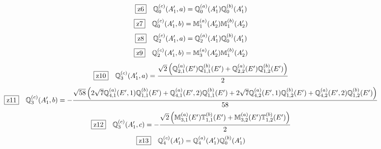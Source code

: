\documentclass[fleqn,10pt,landscape]{jsarticle}
\begin{document}
\begin{dmath*}
\hspace*{3mm}\fbox{z6}\quad \mathbb{Q}_{0}^{(c)}(A_{1}^{\prime},a)=\mathbb{Q}_{0}^{(a)}(A_{1}^{\prime}) \mathbb{Q}_{0}^{(b)}(A_{1}^{\prime})
\end{dmath*}
\begin{dmath*}
\hspace*{3mm}\fbox{z7}\quad \mathbb{Q}_{0}^{(c)}(A_{1}^{\prime},b)=\mathbb{M}_{1}^{(a)}(A_{2}^{\prime}) \mathbb{M}_{1}^{(b)}(A_{2}^{\prime})
\end{dmath*}
\begin{dmath*}
\hspace*{3mm}\fbox{z8}\quad \mathbb{Q}_{2}^{(c)}(A_{1}^{\prime},a)=\mathbb{Q}_{2}^{(a)}(A_{1}^{\prime}) \mathbb{Q}_{0}^{(b)}(A_{1}^{\prime})
\end{dmath*}
\begin{dmath*}
\hspace*{3mm}\fbox{z9}\quad \mathbb{Q}_{2}^{(c)}(A_{1}^{\prime},b)=\mathbb{M}_{3}^{(a)}(A_{2}^{\prime}) \mathbb{M}_{1}^{(b)}(A_{2}^{\prime})
\end{dmath*}
\begin{dmath*}
\hspace*{3mm}\fbox{z10}\quad \mathbb{Q}_{3}^{(c)}(A_{1}^{\prime},a)=\frac{\sqrt{2} \left(\mathbb{Q}_{2,1}^{(a)}(E^{\prime}) \mathbb{Q}_{1,1}^{(b)}(E^{\prime}) + \mathbb{Q}_{2,2}^{(a)}(E^{\prime}) \mathbb{Q}_{1,2}^{(b)}(E^{\prime})\right)}{2}
\end{dmath*}
\begin{dmath*}
\hspace*{3mm}\fbox{z11}\quad \mathbb{Q}_{3}^{(c)}(A_{1}^{\prime},b)=- \frac{\sqrt{58} \left(2 \sqrt{7} \mathbb{Q}_{4,1}^{(a)}(E^{\prime},1) \mathbb{Q}_{1,1}^{(b)}(E^{\prime}) + \mathbb{Q}_{4,1}^{(a)}(E^{\prime},2) \mathbb{Q}_{1,1}^{(b)}(E^{\prime}) + 2 \sqrt{7} \mathbb{Q}_{4,2}^{(a)}(E^{\prime},1) \mathbb{Q}_{1,2}^{(b)}(E^{\prime}) + \mathbb{Q}_{4,2}^{(a)}(E^{\prime},2) \mathbb{Q}_{1,2}^{(b)}(E^{\prime})\right)}{58}
\end{dmath*}
\begin{dmath*}
\hspace*{3mm}\fbox{z12}\quad \mathbb{Q}_{3}^{(c)}(A_{1}^{\prime},c)=- \frac{\sqrt{2} \left(\mathbb{M}_{3,1}^{(a)}(E^{\prime}) \mathbb{T}_{1,1}^{(b)}(E^{\prime}) + \mathbb{M}_{3,2}^{(a)}(E^{\prime}) \mathbb{T}_{1,2}^{(b)}(E^{\prime})\right)}{2}
\end{dmath*}
\begin{dmath*}
\hspace*{3mm}\fbox{z13}\quad \mathbb{Q}_{4}^{(c)}(A_{1}^{\prime})=\mathbb{Q}_{4}^{(a)}(A_{1}^{\prime}) \mathbb{Q}_{0}^{(b)}(A_{1}^{\prime})
\end{dmath*}
\end{document}
